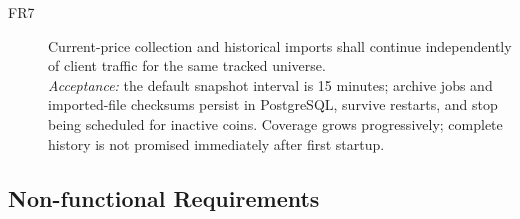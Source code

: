 \documentclass{scrartcl}
\begin{document}
\begin{description}
  \item[FR7] Current-price collection and historical imports shall continue independently of
  client traffic for the same tracked universe. \\
  \emph{Acceptance:} the default snapshot interval is 15 minutes; archive jobs and imported-file
  checksums persist in PostgreSQL, survive restarts, and stop being scheduled for inactive coins.
  Coverage grows progressively; complete history is not promised immediately after first startup.
\end{description}

\subsection{Non-functional Requirements}\label{non-functional-requirements}
\end{document}
